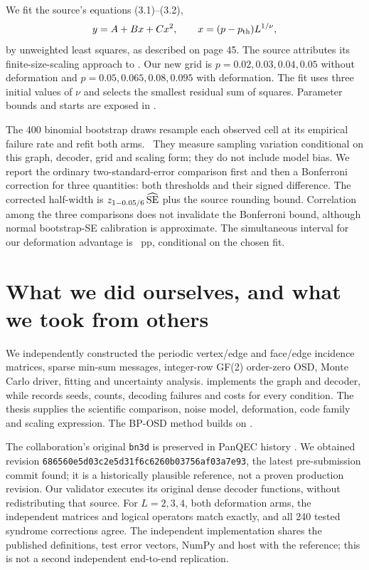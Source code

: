 We fit the source's equations (3.1)--(3.2),
\[
 y=A+Bx+Cx^2,\qquad x=(p-p_{\rm th})L^{1/\nu},
\]
by unweighted least squares, as described on page 45. The source attributes its finite-size-scaling approach to \citet{tuckett2020}. Our new grid is $p=0.02,0.03,0.04,0.05$ without deformation and $p=0.05,0.065,0.08,0.095$ with deformation. The fit uses three initial values of $\nu$ and selects the smallest residual sum of squares. Parameter bounds and starts are exposed in .

The 400 binomial bootstrap draws resample each observed cell at its empirical failure rate and refit both arms. \BootstrapStatus\ They measure sampling variation conditional on this graph, decoder, grid and scaling form; they do not include model bias. We report the ordinary two-standard-error comparison first and then a Bonferroni correction for three quantities: both thresholds and their signed difference. The corrected half-width is $z_{1-0.05/6}\,\widehat{\rm SE}$ plus the source rounding bound. Correlation among the three comparisons does not invalidate the Bonferroni bound, although normal bootstrap-SE calibration is approximate. The simultaneous interval for our deformation advantage is \DeltaInterval\ pp, conditional on the chosen fit.

\section{What we did ourselves, and what we took from others}
We independently constructed the periodic vertex/edge and face/edge incidence matrices, sparse min-sum messages, integer-row GF(2) order-zero OSD, Monte Carlo driver, fitting and uncertainty analysis.  implements the graph and decoder, while  records seeds, counts, decoding failures and costs for every condition. The thesis supplies the scientific comparison, noise model, deformation, code family and scaling expression. The BP-OSD method builds on \citet{roffe2020}.

The collaboration's original \texttt{bn3d} is preserved in PanQEC history \citep{bn3d}. We obtained revision \texttt{686560e5d03c2e5d31f6c6260b03756af03a7e93}, the latest pre-submission commit found; it is a historically plausible reference, not a proven production revision. Our validator executes its original dense decoder functions, without redistributing that source. For $L=2,3,4$, both deformation arms, the independent matrices and logical operators match exactly, and all 240 tested syndrome corrections agree. The independent implementation shares the published definitions, test error vectors, NumPy and host with the reference; this is not a second independent end-to-end replication.

